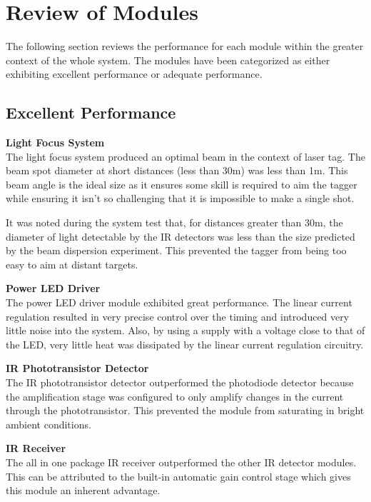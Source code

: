 \section{Review of Modules}
The following section reviews the performance for each module within the greater context of the whole system. The modules have been categorized as either exhibiting excellent performance or adequate performance.




\subsection{Excellent Performance}

\textbf{Light Focus System}\\
The light focus system produced an optimal beam in the context of laser tag. The beam spot diameter at short distances (less than 30m) was less than 1m. This beam angle is the ideal size as it ensures some skill is required to aim the tagger while ensuring it isn't so challenging that it is impossible to make a single shot.

It was noted during the system test that, for distances greater than 30m, the diameter of light detectable by the IR detectors was less than the size predicted by the beam dispersion experiment. This prevented the tagger from being too easy to aim at distant targets.

\textbf{Power LED Driver}\\
The power LED driver module exhibited great performance. The linear current regulation resulted in very precise control over the timing and introduced very little noise into the system. Also, by using a supply with a voltage close to that of the LED, very little heat was dissipated by the linear current regulation circuitry.

\textbf{IR Phototransistor Detector}\\
The IR phototransistor detector outperformed the photodiode detector because the amplification stage was configured to only amplify changes in the current through the phototransistor. This prevented the module from saturating in bright ambient conditions.

\textbf{IR Receiver}\\
The all in one package IR receiver outperformed the other IR detector modules. This can be attributed to the built-in automatic gain control stage which gives this module an inherent advantage.

